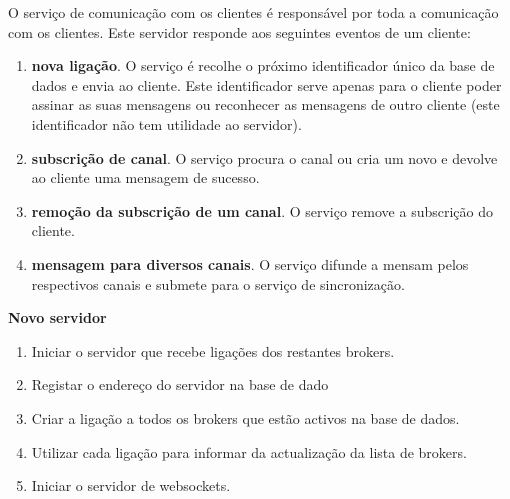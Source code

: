 O serviço de comunicação com os clientes é responsável por toda a comunicação com os clientes. Este servidor responde aos seguintes eventos de um cliente:
\begin{enumerate}
\item \textbf{nova ligação}. O serviço é recolhe o próximo identificador único da base de dados e envia ao cliente. Este identificador serve apenas para o cliente poder assinar as suas mensagens ou reconhecer as mensagens de outro cliente (este identificador não tem utilidade ao servidor).
\item \textbf{subscrição de canal}. O serviço procura o canal ou cria um novo e devolve ao cliente uma mensagem de sucesso.
\item \textbf{remoção da subscrição de um canal}. O serviço remove a subscrição do cliente.
\item \textbf{mensagem para diversos canais}. O serviço difunde a mensam pelos respectivos canais e submete para o serviço de sincronização.
\end{enumerate}

\hl{}

\textbf{Novo servidor}
\begin{enumerate}
\item Iniciar o servidor que recebe ligações dos restantes brokers.
\item Registar o endereço do servidor na base de dado
\item Criar a ligação a todos os brokers que estão activos na base de dados.
\item Utilizar cada ligação para informar da actualização da lista de brokers.
\item Iniciar o servidor de websockets.
\end{enumerate}

